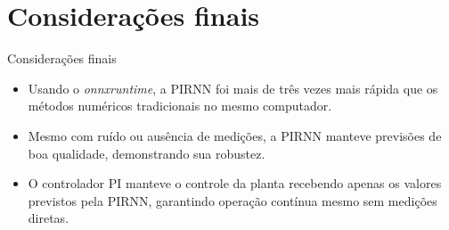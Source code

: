 \section{Considerações finais}

\begin{frame}{Considerações finais}
  \begin{itemize}
    \item Usando o \textit{onnxruntime}, a PIRNN foi mais de três vezes mais rápida que os métodos numéricos tradicionais no mesmo computador.
    \item Mesmo com ruído ou ausência de medições, a PIRNN manteve previsões de boa qualidade, demonstrando sua robustez.
    \item O controlador PI manteve o controle da planta recebendo apenas os valores previstos pela PIRNN, garantindo operação contínua mesmo sem medições diretas.
  \end{itemize}
\end{frame}
